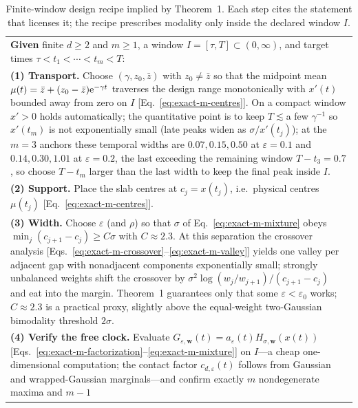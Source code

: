 \begin{table}[!t]
\caption{Finite-window design recipe implied by Theorem~1.  Each step
cites the statement that licenses it; the recipe prescribes modality only
inside the declared window $I$.
\label{tab:design-recipe}}
\begin{ruledtabular}
\begin{tabular}{p{}}
\textbf{Given} finite $d\ge2$ and $m\ge1$, a window
$I=[\tau,T]\subset(0,\infty)$, and target times
$\tau<t_1<\cdots<t_m<T$:\\[3pt]
\textbf{(1) Transport.}  Choose $(\gamma,z_0,\bar z)$ with
$z_0\ne\bar z$ so that the midpoint mean
$\mu(t)=\bar z+(z_0-\bar z)\mathrm e^{-\gamma t}$ traverses the design range
monotonically with $x'(t)$ bounded away from zero on $I$
[Eq.~\eqref{eq:exact-m-centres}].  On a compact window $x'>0$ holds
automatically; the quantitative point is to keep
$T\lesssim{}$a few $\gamma^{-1}$ so $x'(t_m)$ is not exponentially
small (late peaks widen as $\sigma/x'(t_j)$); at the $m=3$ anchors these
temporal widths are $0.07,0.15,0.50$ at $\varepsilon=0.1$ and
$0.14,0.30,1.01$ at $\varepsilon=0.2$, the last exceeding the remaining
window $T-t_3=0.7$, so choose $T-t_m$ larger than the last width to keep the
final peak inside $I$.\\[3pt]
\textbf{(2) Support.}  Place the slab centres at $c_j=x(t_j)$,
i.e.\ physical centres $\mu(t_j)$
[Eq.~\eqref{eq:exact-m-centres}].\\[3pt]
\textbf{(3) Width.}  Choose $\varepsilon$ (and $\rho$) so that
$\sigma$ of Eq.~\eqref{eq:exact-m-mixture} obeys
$\min_j(c_{j+1}-c_j)\ge C\sigma$ with $C\approx2.3$.  At this
separation the crossover analysis
[Eqs.~\eqref{eq:exact-m-crossover}--\eqref{eq:exact-m-valley}] yields
one valley per adjacent gap with nonadjacent components exponentially
small; strongly unbalanced weights shift the crossover by
$\sigma^2\log(w_j/w_{j+1})/(c_{j+1}-c_j)$ and eat into the margin.
Theorem~1 guarantees only that some $\varepsilon<\varepsilon_0$ works;
$C\approx2.3$ is a practical proxy, slightly above the equal-weight
two-Gaussian bimodality threshold $2\sigma$.\\[3pt]
\textbf{(4) Verify the free clock.}  Evaluate
$G_{\varepsilon,\bm w}(t)=a_\varepsilon(t)H_{\sigma,\bm w}(x(t))$
[Eqs.~\eqref{eq:exact-m-factorization}--\eqref{eq:exact-m-mixture}]
on $I$---a cheap one-dimensional computation; the contact factor
$c_{d,\varepsilon}(t)$ follows from Gaussian and wrapped-Gaussian
marginals---and confirm exactly $m$ nondegenerate maxima and $m-1$

\end{tabular}
\end{ruledtabular}
\end{table}
